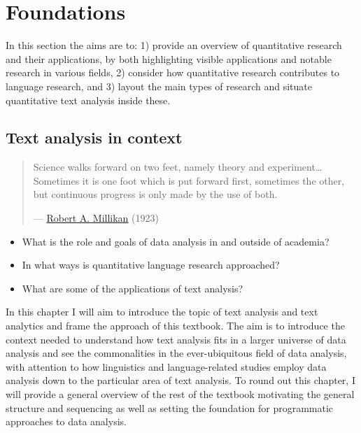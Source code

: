 \documentclass[
  letterpaper,
]{latex/krantz}
\providecommand{\tightlist}{%
  \setlength{\itemsep}{0pt}\setlength{\parskip}{0pt}}\usepackage{longtable,booktabs,array}
\begin{document}
\part{Foundations}

In this section the aims are to: 1) provide an overview of quantitative
research and their applications, by both highlighting visible
applications and notable research in various fields, 2) consider how
quantitative research contributes to language research, and 3) layout
the main types of research and situate quantitative text analysis inside
these.

\hypertarget{sec-text-analysis-in-context}{%
\chapter{Text analysis in context}\label{sec-text-analysis-in-context}}

\begin{quote}
Science walks forward on two feet, namely theory and
experiment\ldots Sometimes it is one foot which is put forward first,
sometimes the other, but continuous progress is only made by the use of
both.

---
\href{https://www.nobelprize.org/uploads/2018/06/millikan-lecture.pdf}{Robert
A. Millikan} (1923)
\end{quote}

\begin{tcolorbox}[enhanced jigsaw, toprule=.15mm, bottomtitle=1mm, coltitle=black, title=\textcolor{quarto-callout-note-color}{\faInfo}\hspace{0.5em}{Keys}, left=2mm, colframe=quarto-callout-note-color-frame, bottomrule=.15mm, colbacktitle=quarto-callout-note-color!10!white, leftrule=.75mm, colback=white, titlerule=0mm, breakable, toptitle=1mm, opacityback=0, arc=.35mm, rightrule=.15mm, opacitybacktitle=0.6]

\begin{itemize}
\tightlist
\item
  What is the role and goals of data analysis in and outside of
  academia?
\item
  In what ways is quantitative language research approached?
\item
  What are some of the applications of text analysis?
\end{itemize}

\end{tcolorbox}

In this chapter I will aim to introduce the topic of text analysis and
text analytics and frame the approach of this textbook. The aim is to
introduce the context needed to understand how text analysis fits in a
larger universe of data analysis and see the commonalities in the
ever-ubiquitous field of data analysis, with attention to how
linguistics and language-related studies employ data analysis down to
the particular area of text analysis. To round out this chapter, I will
provide a general overview of the rest of the textbook motivating the
general structure and sequencing as well as setting the foundation for
programmatic approaches to data analysis.
\end{document}
